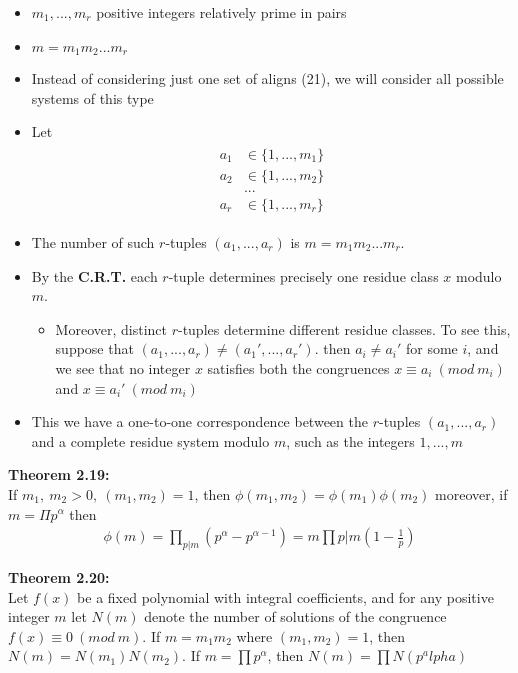 \documentclass[a4paper]{article}
\begin{document}
\begin{itemize}
    \item $m_1,...,m_r$ positive integers relatively prime in pairs
    \item $m=m_1m_2...m_r$
    \item Instead of considering just one set of aligns (21), we will consider
    all possible systems of this type
    \item Let
    \begin{align}
        \begin{split}
            a_1&\in\{1,...,m_1\}\\
            a_2&\in\{1,...,m_2\}\\
            &...\\
            a_r&\in\{1,...,m_r\}
        \end{split}
    \end{align}
    \item The number of such $r$-tuples $(a_1,...,a_r)$ is $m=m_1m_2...m_r$.
    \item By the \textbf{C.R.T.} each $r$-tuple determines precisely one
    residue class $x$ modulo $m$.
    \begin{itemize}
        \item Moreover, distinct $r$-tuples determine different residue classes.
        To see this, suppose that $(a_1,...,a_r)\neq(a_1',...,a_r')$. then
        $a_i\neq a_i'$ for some $i$, and we see that no integer $x$ satisfies both
        the congruences $x\equiv a_i\ (mod\ m_i)$ and $x\equiv a_i'\ (mod\ m_i)$
    \end{itemize}
    \item This we have a one-to-one correspondence between the $r$-tuples
    $(a_1,...,a_r)$ and a complete residue system modulo $m$,
    such as the integers $1,...,m$
\end{itemize}

\textbf{Theorem 2.19:}\\
If $m_1,\ m_2>0,\ (m_1,m_2)=1$, then $\phi(m_1,m_2)=\phi(m_1)\phi(m_2)$
moreover, if $m=\Pi p^\alpha$ then
\begin{align}
    \phi(m)=\prod_{p|m}(p^\alpha-p^{\alpha-1})=m\prod{p|m}(1-\frac{1}{p})
\end{align}


\textbf{Theorem 2.20:}\\
Let $f(x)$ be a fixed polynomial with integral coefficients, and for any positive
integer $m$ let $N(m)$ denote the number of solutions of the congruence
$f(x)\equiv0\ (mod\ m)$. If $m=m_1m_2$ where $(m_1,m_2)=1$, then
$N(m)=N(m_1)N(m_2)$. If $m=\prod p^\alpha$, then $N(m)=\prod N(p^alpha)$
\end{document}

